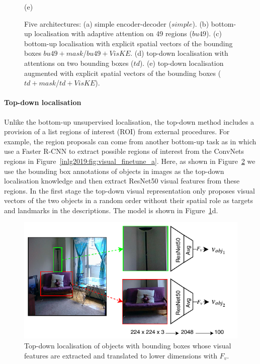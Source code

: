 \begin{figure}[th]
\begin{minipage}{.20\textwidth}
		(e)
	\end{minipage}%
	\caption{Five architectures: (a) simple encoder-decoder ($simple$). (b) bottom-up localisation with adaptive attention on 49 regions ($bu49$). (c) bottom-up localisation with explicit spatial vectors of the bounding boxes $bu49+mask$/$bu49+VisKE$. (d) top-down localisation with attentions on two bounding boxes ($td$). (e) top-down localisation augmented with explicit spatial vectors of the bounding boxes ($td+mask$/$td+VisKE$).}
	\label{inlg2019:fig:architectures}
\end{figure}


\paragraph{Top-down localisation}
Unlike the bottom-up unsupervised localisation, the top-down method includes a provision of a list regions of interest (ROI) from external procedures.
For example, the region proposals can come from another bottom-up task as in \cite{anderson2018bottom,johnson2016densecap} which use a Faster R-CNN \cite{ren2015faster} to extract possible regions of interest from the ConvNets regions in Figure~\ref{inlg2019:fig:visual_finetune_a}.
Here, as shown in Figure~\ref{inlg2019:fig:visual_finetune_b} we use the bounding box annotations of objects in images as the top-down localisation knowledge and then  extract ResNet50 visual features from these regions.
In the first stage the top-down visual representation only proposes visual vectors of the two objects in a random order without their spatial role as targets and landmarks in the descriptions. The model is shown in Figure~\ref{inlg2019:fig:architectures}d.

\begin{figure}[htb]
	\begin{minipage}{\linewidth}
		\centering
		\includegraphics[scale=0.75]{studies/inlg2019/figures/objects_visual_features.pdf}
	\end{minipage}%
	\caption{
		Top-down localisation of objects with bounding boxes whose visual features are extracted and translated to lower dimensions with $F_v$.
	}
	\label{inlg2019:fig:visual_finetune_b}
\end{figure}

